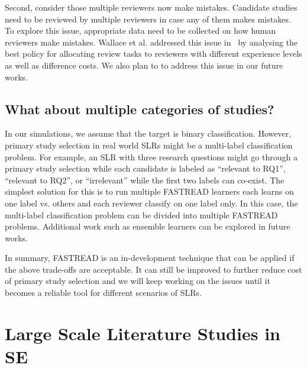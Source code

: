 \documentclass{svjour3}
\theoremstyle{break}
\begin{document}
Second, consider those multiple reviewers now make mistakes. Candidate studies need to be reviewed by multiple reviewers in case any of them makes mistakes. To explore this issue, appropriate data need to be collected on how human reviewers make mistakes. Wallace et al. addressed this issue in~\cite{nguyen2015combining} by analysing the best policy for allocating review tasks to reviewers with different experience levels as well as difference costs. We also plan to to address this issue in our future works.


\subsection{What about multiple categories of studies?}

In our simulations, we assume that the target is binary classification. However, primary study selection in real world SLRs might be a multi-label classification problem. For example, an SLR with three research questions might go through a primary study selection while each candidate is labeled as ``relevant to RQ1'', ``relevant to RQ2'', or ``irrelevant'' while the first two labels can co-exist. The simplest solution for this is to run multiple FASTREAD learners each learns on one label vs. others and each reviewer classify on one label only. In this case, the multi-label classification problem can be divided into multiple FASTREAD problems. Additional work such as ensemble learners can be explored in future works.

In summary, FASTREAD is an in-development technique that can be applied if the above trade-offs are acceptable. It can still be improved to further reduce cost of primary study selection and we will keep working on the issues until it becomes a reliable tool for different scenarios of SLRs.

























\section{Large Scale Literature Studies in SE}
\label{sect: Background}
\end{document}
